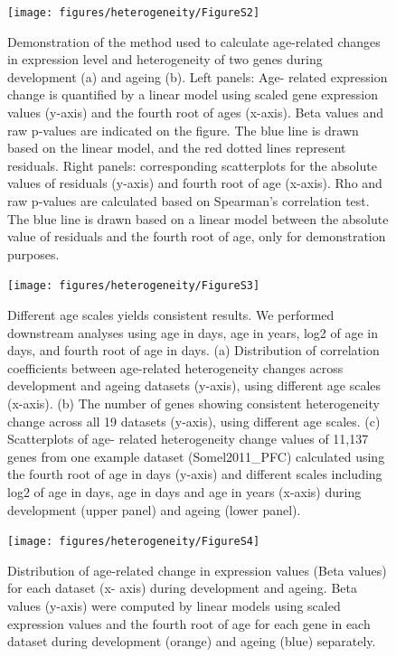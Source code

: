\documentclass[12pt,twoside]{unicam}
\begin{document}
\begin{figure}

{\centering \texttt{[image: figures/heterogeneity/FigureS2]} 

}

\caption[Demonstration of the methods to calculate age-related changes in the expression level and heterogeneity.]{Demonstration of the method used to calculate age-related changes in expression level and heterogeneity of two genes during development (a) and ageing (b). Left panels: Age- related expression change is quantified by a linear model using scaled gene expression values (y-axis) and the fourth root of ages (x-axis). Beta values and raw p-values are indicated on the figure. The blue line is drawn based on the linear model, and the red dotted lines represent residuals. Right panels: corresponding scatterplots for the absolute values of residuals (y-axis) and fourth root of age (x-axis). Rho and raw p-values are calculated based on Spearman's correlation test. The blue line is drawn based on a linear model between the absolute value of residuals and the fourth root of age, only for demonstration purposes.}\label{fig:hetFigS2}
\end{figure}

\begin{figure}

{\centering \texttt{[image: figures/heterogeneity/FigureS3]} 

}

\caption[Summary of the results using different age scales.]{Different age scales yields consistent results. We performed downstream analyses using age in days, age in years, log2 of age in days, and fourth root of age in days. (a) Distribution of correlation coefficients between age-related heterogeneity changes across development and ageing datasets (y-axis), using different age scales (x-axis). (b) The number of genes showing consistent heterogeneity change across all 19 datasets (y-axis), using different age scales. (c) Scatterplots of age- related heterogeneity change values of 11,137 genes from one example dataset (Somel2011\_PFC) calculated using the fourth root of age in days (y-axis) and different scales including log2 of age in days, age in days and age in years (x-axis) during development (upper panel) and ageing (lower panel).}\label{fig:hetFigS3}
\end{figure}

\begin{figure}

{\centering \texttt{[image: figures/heterogeneity/FigureS4]} 

}

\caption[Distribution of the age-related changes in gene expression level.]{Distribution of age-related change in expression values (Beta values) for each dataset (x- axis) during development and ageing. Beta values (y-axis) were computed by linear models using scaled expression values and the fourth root of age for each gene in each dataset during development (orange) and ageing (blue) separately.}\label{fig:hetFigS4}
\end{figure}
\end{document}

